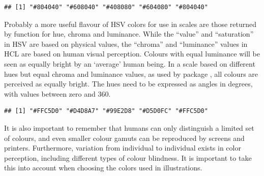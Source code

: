 \documentclass[krantz2]{krantz}\usepackage{knitr}%
\begin{document}
\begin{knitrout}\footnotesize
{}\color{fgcolor}\begin{kframe}
\begin{alltt}
\hlstd{(}\hlstd{(}\hlstd{,}\hlstd{,}\hlstd{,}\hlstd{,}\hlstd{),} \hlstd{,} \hlstd{)}
\end{alltt}
\begin{verbatim}
## [1] "#804040" "#608040" "#408080" "#604080" "#804040"
\end{verbatim}
\end{kframe}
\end{knitrout}

Probably a more useful flavour of HSV colors for use in scales are those returned by function  for hue, chroma and luminance. While the ``value'' and ``saturation'' in HSV are based on physical values, the ``chroma'' and ``luminance'' values in HCL are based on human visual perception. Colours with equal luminance will be seen as equally bright by an `average' human being. In a scale based on different hues but equal chroma and luminance values, as used by package \ggplot, all colours are perceived as equally bright. The hues need to be expressed as angles in degrees, with values between zero and 360.

\begin{knitrout}\footnotesize
{}\color{fgcolor}\begin{kframe}
\begin{alltt}
\hlstd{(}\hlstd{(}\hlstd{,}\hlstd{,}\hlstd{,}\hlstd{,}\hlstd{)} \hlopt{*} \hlstd{)}
\end{alltt}
\begin{verbatim}
## [1] "#FFC5D0" "#D4D8A7" "#99E2D8" "#D5D0FC" "#FFC5D0"
\end{verbatim}
\end{kframe}
\end{knitrout}

It is also important to remember that humans can only distinguish a limited set of colours, and even smaller colour gamuts can be reproduced by screens and printers. Furthermore, variation from individual to individual exists in color perception, including different types of colour blindness. It is important to take this into account when choosing the colors used in illustrations.
\end{document}
